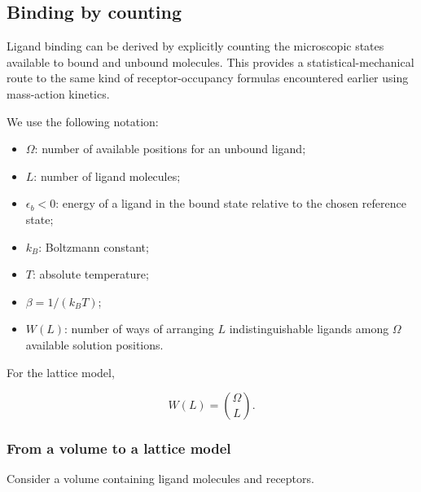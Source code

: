 \subsection{Binding by counting}

Ligand binding can be derived by explicitly counting the microscopic states available to bound and unbound molecules.
This provides a statistical-mechanical route to the same kind of receptor-occupancy formulas encountered earlier using mass-action kinetics.

We use the following notation:

\begin{itemize}
    \item $\Omega$: number of available positions for an unbound ligand;
    \item $L$: number of ligand molecules;
    \item $\epsilon_b<0$: energy of a ligand in the bound state relative to the chosen reference state;
    \item $k_B$: Boltzmann constant;
    \item $T$: absolute temperature;
    \item $\beta=1/(k_BT)$;
    \item $W(L)$: number of ways of arranging $L$ indistinguishable ligands among $\Omega$ available solution positions.
\end{itemize}

For the lattice model,

\begin{equation}
    W(L)=\binom{\Omega}{L}.
\end{equation}


\subsubsection{From a volume to a lattice model}

Consider a volume containing ligand molecules and receptors.

